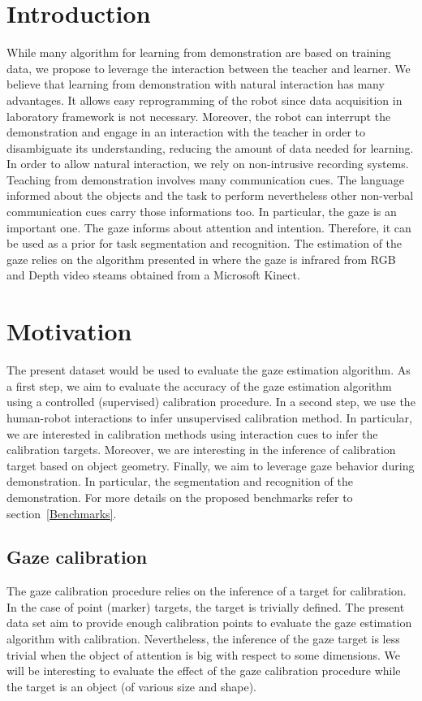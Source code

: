 \documentclass[11pt,a4paper]{article}
\begin{document}
\section{Introduction}
While many algorithm for learning from demonstration are based on training data, we propose to leverage the interaction between the teacher and learner. We believe that learning from demonstration with natural interaction has many advantages. It allows easy reprogramming of the robot since data acquisition in laboratory framework is not necessary. Moreover, the robot can interrupt the demonstration and engage in an interaction with the teacher in order to disambiguate its understanding, reducing the amount of data needed for learning.
\newline
In order to allow natural interaction, we rely on non-intrusive recording systems. Teaching from demonstration involves many communication cues. The language informed about the objects and the task to perform nevertheless other non-verbal communication cues carry those informations too. In particular, the gaze is an important one. 
\newline
The gaze informs about attention and intention. Therefore, it can be used as a prior for task segmentation and recognition. The estimation of the gaze relies on the algorithm presented in \cite{Funes2016} where the gaze is infrared from RGB and Depth video steams obtained from a Microsoft Kinect.

\section{Motivation}
The present dataset would be used to evaluate the gaze estimation algorithm. As a first step, we aim to evaluate the accuracy of the gaze estimation algorithm using a controlled (supervised) calibration procedure. In a second step, we use the human-robot interactions to infer unsupervised calibration method. In particular, we are interested in calibration methods using interaction cues to infer the calibration targets. Moreover, we are interesting in the inference of calibration target based on object geometry. Finally, we aim to leverage gaze behavior during demonstration. In particular, the segmentation and recognition of the demonstration. For more details on the proposed benchmarks refer to section~\ref{Benchmarks}.
\subsection{Gaze calibration}
The gaze calibration procedure relies on the inference of a target for calibration. In the case of point (marker) targets, the target is trivially defined. The present data set aim to provide enough calibration points to evaluate the gaze estimation algorithm with calibration. Nevertheless, the inference of the gaze target is less trivial when the object of attention is big with respect to some dimensions. We will be interesting to evaluate the effect of the gaze calibration procedure while the target is an object (of various size and shape).
\end{document}
